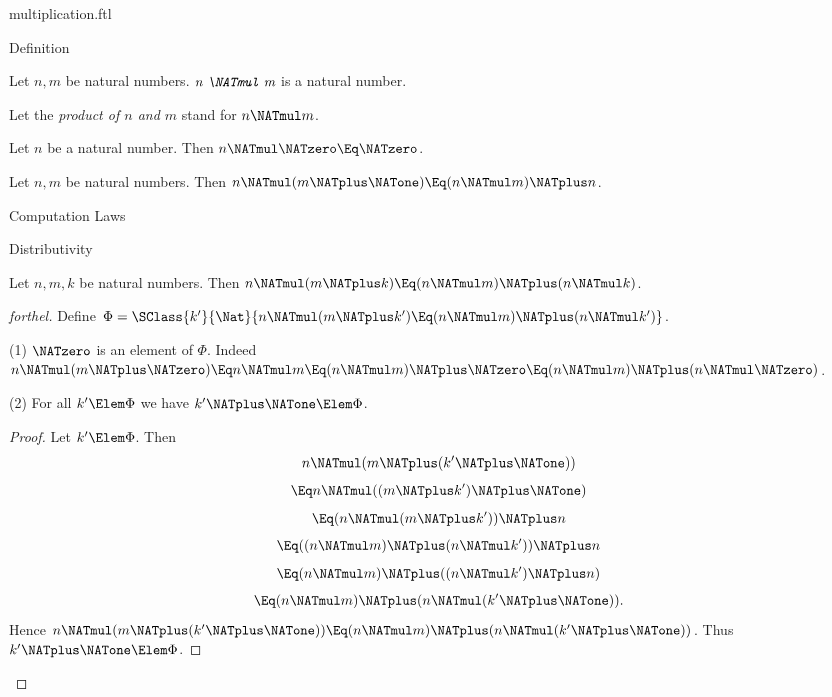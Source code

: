 \documentclass{stex}
\begin{document}
\begin{smodule}{multiplication.ftl}

\begin{sfragment}{Definition}
  \begin{signature}[forthel,id=ARITHMETIC_06_6626346484629504]
    Let $n, m$ be natural numbers.
    $\emph{n \NATmul m}$ is a natural number.

    Let the \emph{product of $n$ and $m$} stand for $n \NATmul m$.
  \end{signature}

  \begin{axiom}[forthel,id=ARITHMETIC_06_8941041092657152]
    Let $n$ be a natural number.
    Then $n \NATmul \NATzero \Eq \NATzero$.
  \end{axiom}

  \begin{axiom}[forthel,id=ARITHMETIC_06_2211275408932864]
    Let $n, m$ be natural numbers.
    Then $n \NATmul (m \NATplus \NATone) \Eq (n \NATmul m) \NATplus n$.
  \end{axiom}
\end{sfragment}

\begin{sfragment}{Computation Laws}
  \begin{sfragment}{Distributivity}
    \begin{proposition}[forthel,id=ARITHMETIC_06_9001524774567936]
      Let $n, m, k$ be natural numbers.
      Then $n \NATmul (m \NATplus k) \Eq (n \NATmul m) \NATplus (n \NATmul k)$.
    \end{proposition}
    \begin{proof}[forthel]
      Define $\Phi = \SClass{k'}{\Nat}{n \NATmul (m \NATplus k') \Eq (n \NATmul m) \NATplus (n \NATmul k')}$.

      (1) $\NATzero$ is an element of $\Phi$.
      Indeed $n \NATmul (m \NATplus \NATzero)
        \Eq n \NATmul m
        \Eq (n \NATmul m) \NATplus \NATzero
        \Eq (n \NATmul m) \NATplus (n \NATmul \NATzero)$.

      (2) For all $k' \Elem \Phi$ we have $k' \NATplus \NATone \Elem \Phi$. 
      \begin{proof}
        Let $k'\Elem \Phi$.
        Then
        \[  n \NATmul (m \NATplus (k' \NATplus \NATone))                  \]
        \[    \Eq n \NATmul ((m \NATplus k') \NATplus \NATone)              \]
        \[    \Eq (n \NATmul (m \NATplus k')) \NATplus n              \]
        \[    \Eq ((n \NATmul m) \NATplus (n \NATmul k')) \NATplus n    \]
        \[    \Eq (n \NATmul m) \NATplus ((n \NATmul k') \NATplus n)    \]
        \[    \Eq (n \NATmul m) \NATplus (n \NATmul (k' \NATplus \NATone)).   \]
        Hence $n \NATmul (m \NATplus (k' \NATplus \NATone)) \Eq (n \NATmul m) \NATplus (n \NATmul (k' \NATplus \NATone))$.
        Thus $k' \NATplus \NATone \Elem \Phi$.
      \end{proof}


\end{proof}
\end{sfragment}
\end{sfragment}
\end{smodule}
\end{document}
